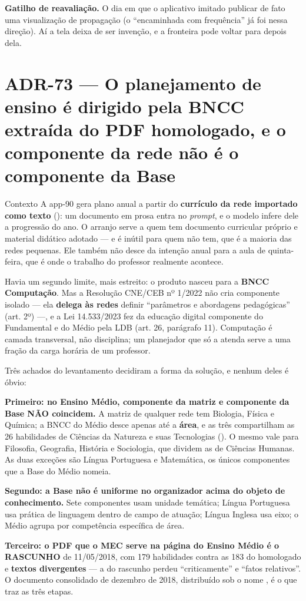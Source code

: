 \textbf{Gatilho de reavaliação.} O dia em que o aplicativo imitado publicar de
fato uma visualização de propagação (o \enquote{encaminhada com frequência} já
foi nessa direção). Aí a tela deixa de ser invenção, e a fronteira pode voltar
para depois dela.



\section{ADR-73 --- O planejamento de ensino é dirigido pela BNCC extraída do
PDF homologado, e o componente da rede não é o componente da Base}
\label{adr:plano-de-ensino-bncc}

\begin{especificacao}{Contexto}
A app-90 gera plano anual a partir do \textbf{currículo da rede importado como
texto} (): um documento em prosa entra no \emph{prompt}, e o modelo
infere dele a progressão do ano. O arranjo serve a quem tem documento curricular
próprio e material didático adotado --- e é inútil para quem não tem, que é a
maioria das redes pequenas. Ele também não desce da intenção anual para a aula
de quinta-feira, que é onde o trabalho do professor realmente acontece.

Havia um segundo limite, mais estreito: o produto nasceu para a
\textbf{BNCC Computação}. Mas a Resolução CNE/CEB nº 1/2022 não cria componente
isolado --- ela \textbf{delega às redes} definir \enquote{parâmetros e abordagens
pedagógicas} (art. 2º) ---, e a Lei 14.533/2023 fez da educação digital
componente do Fundamental e do Médio pela LDB (art. 26, parágrafo 11). Computação
é camada transversal, não disciplina; um planejador que só a atenda serve a uma
fração da carga horária de um professor.

Três achados do levantamento decidiram a forma da solução, e nenhum deles é
óbvio:

\textbf{Primeiro: no Ensino Médio, componente da matriz e componente da Base
NÃO coincidem.} A matriz de qualquer rede tem Biologia, Física e Química; a BNCC
do Médio desce apenas até a \textbf{área}, e as três compartilham as 26
habilidades de Ciências da Natureza e suas Tecnologias (). O mesmo
vale para Filosofia, Geografia, História e Sociologia, que dividem as de Ciências
Humanas. As duas exceções são Língua Portuguesa e Matemática, os únicos
componentes que a Base do Médio nomeia.

\textbf{Segundo: a Base não é uniforme no organizador acima do objeto de
conhecimento.} Sete componentes usam unidade temática; Língua Portuguesa usa
prática de linguagem dentro de campo de atuação; Língua Inglesa usa eixo; o
Médio agrupa por competência específica de área.

\textbf{Terceiro: o PDF que o MEC serve na página do Ensino Médio é o RASCUNHO}
de 11/05/2018, com 179 habilidades contra as 183 do homologado e
\textbf{textos divergentes} --- a  do rascunho perdeu
\enquote{criticamente} e \enquote{fatos relativos}. O documento consolidado de
dezembro de 2018, distribuído sob o nome , é o que traz
as três etapas.
\end{especificacao}

